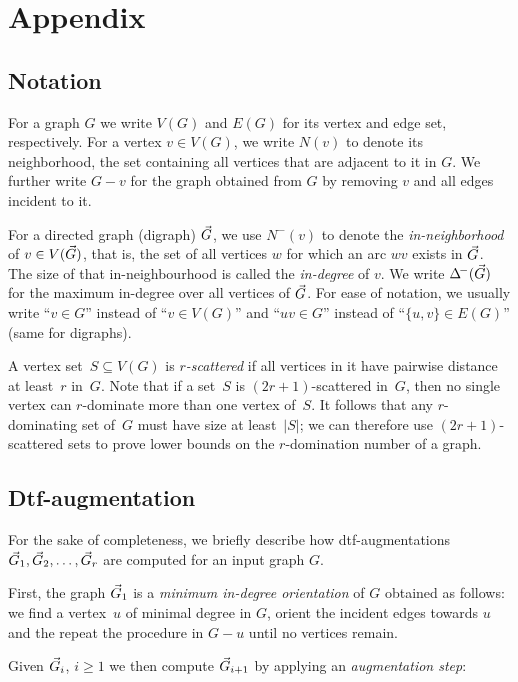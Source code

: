 \appendix

\section{Appendix}

\subsection{Notation}\label{app:notation} For a graph $G$
we write $V(G)$ and $E(G)$ for its vertex and edge set, respectively. For a
vertex $v \in V(G)$, we write $N(v)$ to denote its neighborhood, \ie the set
containing all vertices that are adjacent to it in $G$. We further
write $G-v$ for the graph obtained from $G$ by removing $v$ and all edges
incident to it.

For a directed graph (digraph) $\vec{G}$, we use $N^-(v)$ to denote
the \emph{in-neighborhood} of $v \in V(\vec{G})$, that is, the set 
of all vertices $w$ for which an arc $wv$ exists in $\vec{G}$. The
size of that in-neighbourhood is called the \emph{in-degree} of $v$.
We write $\Delta^{\!-}(\vec{G})$ for the maximum in-degree over all 
vertices of $\vec{G}$.
For ease of notation, we usually write ``$v \in G$'' instead of 
``$v \in V(G)$'' and ``$uv \in G$'' instead of ``$\{u,v\} \in E(G)$''
(same for digraphs).

A vertex set~$S \subseteq V(G)$ is \emph{$r$-scattered} if all vertices
in it have pairwise distance at least~$r$ in~$G$. Note that if a set~$S$
is $(2r+1)$-scattered in~$G$, then no single vertex can $r$-dominate
more than one vertex of~$S$. It follows that any $r$-dominating set of~$G$ must
have size at least~$|S|$; we can therefore use $(2r+1)$-scattered sets to
prove lower bounds on the $r$-domination number of a graph.

\subsection{Dtf-augmentation}\label{app:dtf} For the sake
of completeness, we briefly describe how dtf-augmentations
$\vec{G}_1, \vec{G}_2, \ldots, \vec{G}_r$ are computed for an input
graph $G$. 

First, the graph $\vec{G}_1$ is a \emph{minimum in-degree
orientation} of $G$ obtained as follows: we find a vertex~$u$ of
minimal degree in $G$, orient the incident edges towards $u$ and
the repeat the procedure in $G - u$ until no vertices remain.

Given $\vec{G}_i$, $i \geq 1$ we then compute $\vec{G}_{i+1}$ by
applying an \emph{augmentation step}:

